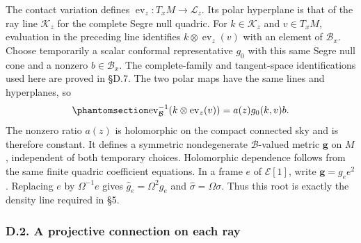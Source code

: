 \documentclass[
  english,
  11pt,
  reqno]{amsart}
\begin{document}
The contact variation defines
\(\operatorname{ev}_z:T_xM\to\mathcal L_z\). Its polar hyperplane is
that of the ray line \(\mathcal K_z\) for the complete Segre null
quadric. For \(k\in\mathcal K_z\) and \(v\in T_xM\), evaluation in the
preceding line identifies \(k\otimes\operatorname{ev}_z(v)\) with an
element of \(\mathcal B_x\). Choose temporarily a scalar conformal
representative \(g_0\) with this same Segre null cone and a nonzero
\(b\in\mathcal B_x\). The complete-family and tangent-space
identifications used here are proved in §D.7. The two polar maps have
the same lines and hyperplanes, so
\begin{equation}\protect\phantomsection\label{eq:gg-intrinsic-metric-ratio}{
 \operatorname{ev}_{\mathcal B}^{-1}
       (k\otimes\operatorname{ev}_z(v))
          =a(z)g_0(k,v)b .
}\end{equation} The nonzero ratio \(a(z)\) is holomorphic on the compact
connected sky and is therefore constant. It defines a symmetric
nondegenerate \(\mathcal B\)-valued metric \(\boldsymbol g\) on \(M\),
independent of both temporary choices. Holomorphic dependence follows
from the same finite quadric coefficient equations. In a frame \(e\) of
\(\mathcal E[1]\), write \(\boldsymbol g=g_e e^2\). Replacing \(e\) by
\(\Omega^{-1}e\) gives \(\widehat g_e=\Omega^2g_e\) and
\(\widehat\sigma=\Omega\sigma\). Thus this root is exactly the density
line required in §5.

\protect{}\label{sec:gg-optical-projective-ray}

\subsubsection{D.2. A projective connection on each
ray}\label{d.2.-a-projective-connection-on-each-ray}
\end{document}
